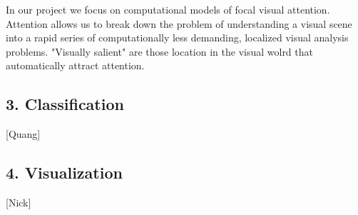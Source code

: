 In our project we focus on computational models of focal visual attention. Attention allows us to break down the problem of understanding a visual scene into a rapid series of computationally less demanding, localized visual analysis problems. 
"Visually salient" are those location in the visual wolrd that automatically attract attention.

\subsection{3. Classification}
[Quang]
\subsection{4. Visualization}
[Nick]
